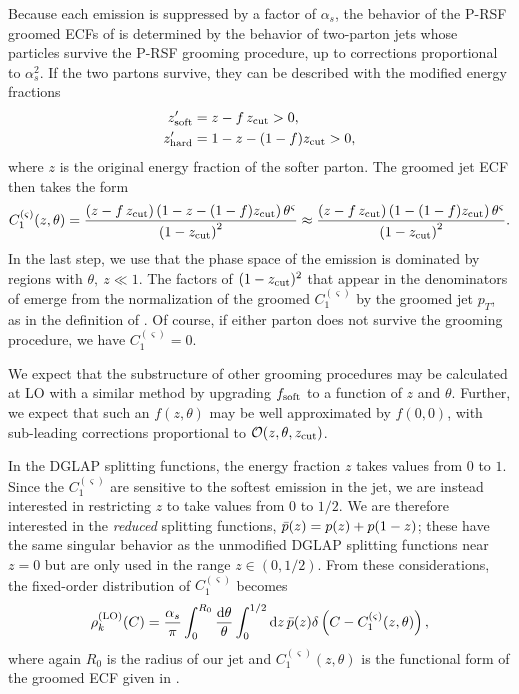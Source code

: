 Because each emission is suppressed by a factor of \(\alpha_s\), the behavior of the P-RSF groomed ECFs of  is determined by the behavior of two-parton jets whose particles survive the P-RSF grooming procedure, up to corrections proportional to \(\alpha_s^2\).
%
If the two partons survive, they can be described with the modified energy fractions
\begin{align}
    z_{\rm soft}' &= z - f\,z_{\rm cut} > 0,
    \\
    z_{\rm hard}' &= 1 - z - (1-f)z_{\rm cut} > 0,
\end{align}
where \(z\) is the original energy fraction of the softer parton.
%
The groomed jet ECF then takes the form
\begin{equation}
    C_1^{(\varsigma)}(z,\theta)
    =
    \frac{\left(z - f\,z_{\rm cut}\right)\left(1 - z - (1-f)z_{\rm cut}\right)\theta^\varsigma}{\left(1 - z_{\rm cut}\right)^2}
    \approx
    \frac{\left(z - f\,z_{\rm cut}\right)\left(1 - (1-f)z_{\rm cut}\right)\theta^\varsigma}{\left(1 - z_{\rm cut}\right)^2}
    \label{eqn:oneEm_groomedECFdefn}
    .
\end{equation}
In the last step, we use that the phase space of the emission is dominated by regions with \(\theta,~z \ll 1\).
%
The factors of \((1-z_{\rm cut})^2\) that appear in the denominators of  emerge from the normalization of the groomed \(C_1^{(\varsigma)}\) by the groomed jet \(p_T\), as in the definition of .
%
Of course, if either parton does not survive the grooming procedure, we have \(C_1^{(\varsigma)} = 0\).

We expect that the substructure of other \PIRANHA{} grooming procedures may be calculated at LO with a similar method by upgrading \(f_{\rm soft}\) to a function of \(z\) and \(\theta\).
%
Further, we expect that such an \(f(z, \theta)\) may be well approximated by \(f(0,0)\), with sub-leading corrections proportional to \(\mathcal{O}(z, \theta, z_{\rm cut})\).

In the DGLAP splitting functions, the energy fraction \(z\) takes values from \(0\) to \(1\).
%
Since the \(C_1^{(\varsigma)}\) are sensitive to the softest emission in the jet, we are instead interested in restricting \(z\) to take values from \(0\) to \(1/2\).
%
We are therefore interested in the \textit{reduced} splitting functions, \(\Bar{p}(z) = p(z) + p(1-z)\);
%
these have the same singular behavior as the unmodified DGLAP splitting functions near \(z = 0\) but are only used in the range \(z\in(0, 1/2)\).
%
From these considerations, the fixed-order distribution of \(C_1^{(\varsigma)}\) becomes
%
\begin{align}
    \rho^{\rm(LO)}_{k}(C)
    =
    \frac{\alpha_s}{\pi}\int_0^{R_0}\frac{\dd\theta}{\theta}
    \int_0^{1/2} \dd z\, \Bar{p}(z)
    \delta\left(C - C_1^{(\varsigma)}(z,\theta)\right),
    \label{eqn:LO_dist_setup}
\end{align}
%
where again \(R_0\) is the radius of our jet and \(C_1^{(\varsigma)}(z,\theta)\) is the functional form of the groomed ECF given in .

